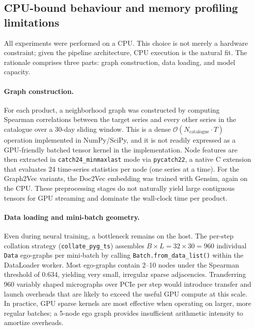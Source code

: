 \subsection*{CPU-bound behaviour and memory profiling limitations}

All experiments were performed on a CPU. This choice is not merely a hardware constraint; given the pipeline architecture, CPU execution is the natural fit. The rationale comprises three parts: graph construction, data loading, and model capacity.

\paragraph{Graph construction.}
For each product, a neighborhood graph was constructed by computing Spearman correlations between the target series and every other series in the catalogue over a 30-day sliding window. This is a dense $\mathcal{O}(N_{\text{catalogue}} \cdot T)$ operation implemented in NumPy/SciPy, and it is not readily expressed as a GPU-friendly batched tensor kernel in the implementation. Node features are then extracted in \texttt{catch24\_minmaxlast} mode via \texttt{pycatch22}, a native C extension that evaluates 24 time-series statistics per node (one series at a time). For the Graph2Vec variants, the Doc2Vec embedding was trained with Gensim, again on the CPU. These preprocessing stages do not naturally yield large contiguous tensors for GPU streaming and dominate the wall-clock time per product.

\paragraph{Data loading and mini-batch geometry.}
Even during neural training, a bottleneck remains on the host. The per-step collation strategy (\texttt{collate\_pyg\_ts}) assembles $B \times L = 32 \times 30 = 960$ individual \texttt{Data} ego-graphs per mini-batch by calling \texttt{Batch.from\_data\_list()} within the DataLoader worker. Most ego-graphs contain 2--10 nodes under the Spearman threshold of 0.634, yielding very small, irregular sparse adjacencies. Transferring 960 variably shaped micrographs over PCIe per step would introduce transfer and launch overheads that are likely to exceed the useful GPU compute at this scale. In practice, GPU sparse kernels are most effective when operating on larger, more regular batches; a 5-node ego graph provides insufficient arithmetic intensity to amortize overheads.

